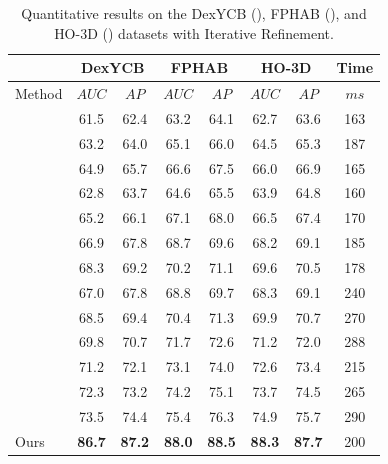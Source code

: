 \begin{table}[h]
\caption{Quantitative results on the DexYCB (\cite{chao2021dexycb}), FPHAB (\cite{garcia2018first}), and HO-3D (\cite{hampali2020honnotate}) datasets with Iterative Refinement.}
\label{tab:dataset_with_ir}
\begin{center}
\begin{tabular}{|l|c|c|c|c|c|c|c|} 
\hline
& \multicolumn{2}{c|}{DexYCB} & \multicolumn{2}{c|}{FPHAB} & \multicolumn{2}{c|}{HO-3D} & Time \\
\hline
Method & $AUC$ & $AP$ & $AUC$ & $AP$ & $AUC$ & $AP$ & $ms$ \\  
\hline 
\cite{wang20216d} & 61.5 & 62.4 & 63.2 & 64.1 & 62.7 & 63.6 & 163 \\
\cite{gao20206d} & 63.2 & 64.0 & 65.1 & 66.0 & 64.5 & 65.3 & 187 \\
\cite{guo2021efficient} & 64.9 & 65.7 & 66.6 & 67.5 & 66.0 & 66.9 & 165 \\
\hline 
\cite{billings2019silhonet} & 62.8 & 63.7 & 64.6 & 65.5 & 63.9 & 64.8 & 160 \\
\cite{peng2019pvnet} & 65.2 & 66.1 & 67.1 & 68.0 & 66.5 & 67.4 & 170 \\
\cite{wang2021gdr} & 66.9 & 67.8 & 68.7 & 69.6 & 68.2 & 69.1 & 185 \\
\cite{castro2023crt} & 68.3 & 69.2 & 70.2 & 71.1 & 69.6 & 70.5 & 178 \\
\hline
\cite{wang2019densefusion} & 67.0 & 67.8 & 68.8 & 69.7 & 68.3 & 69.1 & 240 \\
\cite{he2020pvn3d} & 68.5 & 69.4 & 70.4 & 71.3 & 69.9 & 70.7 & 270 \\
\cite{he2021ffb6d} & 69.8 & 70.7 & 71.7 & 72.6 & 71.2 & 72.0 & 288 \\
\cite{wu2023geometric} & 71.2 & 72.1 & 73.1 & 74.0 & 72.6 & 73.4 & 215 \\
\cite{hong2024rdpn6d} & 72.3 & 73.2 & 74.2 & 75.1 & 73.7 & 74.5 & 265 \\
\cite{lin2024hipose} & 73.5 & 74.4 & 75.4 & 76.3 & 74.9 & 75.7 & 290 \\
Ours & \textbf{86.7} & \textbf{87.2} & \textbf{88.0} & \textbf{88.5} & \textbf{88.3} & \textbf{87.7} & 200 \\
\hline
\end{tabular}
\end{center}
\end{table}


